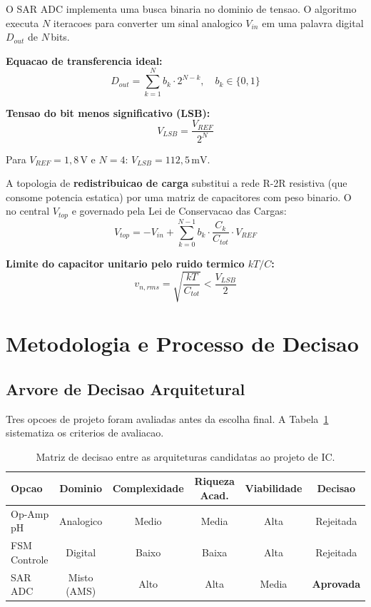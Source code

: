 \documentclass[12pt, a4paper]{article}
\begin{document}
O SAR ADC implementa uma busca binaria no dominio de tensao. O algoritmo executa $N$ iteracoes
para converter um sinal analogico $V_{in}$ em uma palavra digital $D_{out}$ de $N$\,bits.

\textbf{Equacao de transferencia ideal:}
\begin{equation}
  D_{out} = \sum_{k=1}^{N} b_k \cdot 2^{N-k}, \quad b_k \in \{0, 1\}
  \label{eq:transfer}
\end{equation}

\textbf{Tensao do bit menos significativo (LSB):}
\begin{equation}
  V_{LSB} = \frac{V_{REF}}{2^N}
  \label{eq:vlsb}
\end{equation}

Para $V_{REF} = 1{,}8\,\text{V}$ e $N = 4$: $V_{LSB} = 112{,}5\,\text{mV}$.

A topologia de \textbf{redistribuicao de carga} substitui a rede R-2R resistiva (que consome
potencia estatica) por uma matriz de capacitores com peso binario. O no central
$V_{top}$ e governado pela Lei de Conservacao das Cargas:
\begin{equation}
  V_{top} = -V_{in} + \sum_{k=0}^{N-1} b_k \cdot \frac{C_k}{C_{tot}} \cdot V_{REF}
  \label{eq:vtop}
\end{equation}

\textbf{Limite do capacitor unitario pelo ruido termico $kT/C$:}
\begin{equation}
  v_{n,rms} = \sqrt{\frac{kT}{C_{tot}}} < \frac{V_{LSB}}{2}
  \label{eq:ktc}
\end{equation}

\section{Metodologia e Processo de Decisao}

\subsection{Arvore de Decisao Arquitetural}

Tres opcoes de projeto foram avaliadas antes da escolha final. A Tabela~\ref{tab:decisao}
sistematiza os criterios de avaliacao.

\begin{table}[h!]
\centering
\caption{Matriz de decisao entre as arquiteturas candidatas ao projeto de IC.}
\label{tab:decisao}
\begin{tabular}{lccccc}
\toprule
\textbf{Opcao} & \textbf{Dominio} & \textbf{Complexidade} & \textbf{Riqueza Acad.} & \textbf{Viabilidade} & \textbf{Decisao} \\
\midrule
Op-Amp pH      & Analogico       & Medio  & Media  & Alta  & Rejeitada \\
FSM Controle   & Digital         & Baixo  & Baixa  & Alta  & Rejeitada \\
SAR ADC        & Misto (AMS)     & Alto   & Alta   & Media & \textbf{Aprovada} \\
\bottomrule
\end{tabular}
\end{table}
\end{document}
